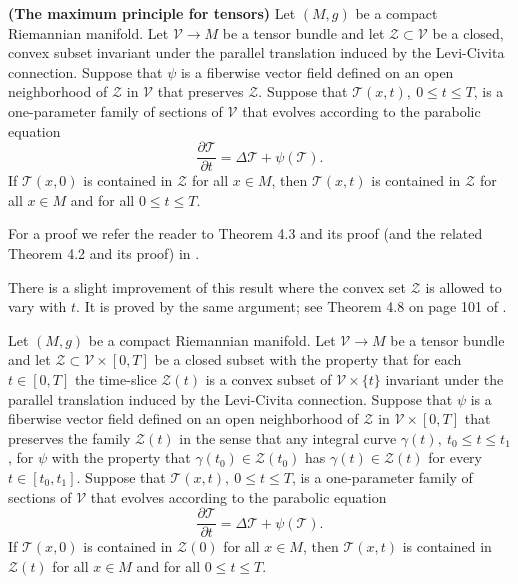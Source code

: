 \begin{theorem}
\label{thm:maximum-principle-tensors-global}
\label{MP}{\bf (The maximum principle for tensors)}
Let $(M,g)$ be a compact Riemannian manifold. Let ${\mathcal V}\to M$ be a
tensor bundle and let ${\mathcal Z}\subset {\mathcal V}$ be a closed, convex
subset invariant under the parallel translation induced by the Levi-Civita
connection. Suppose that $\psi$ is a fiberwise vector field defined on an open
neighborhood of ${\mathcal Z}$ in ${\mathcal V}$ that preserves ${\mathcal Z}$.
Suppose that ${\mathcal T}(x,t),\ 0\le t\le T$, is a one-parameter family of
sections of ${\mathcal V}$ that evolves according to the parabolic equation
$$\frac{\partial {\mathcal T}}{\partial t}=\Delta {\mathcal T}
+\psi({\mathcal T}).$$ If ${\mathcal T}(x,0)$ is contained in
${\mathcal Z}$ for all $x\in M$, then ${\mathcal T}(x,t)$ is
contained in ${\mathcal Z}$ for all $x\in M$ and for all $0\le t\le
T$.
\end{theorem}


For a proof we refer the reader to  Theorem 4.3 and its proof (and
the related Theorem 4.2 and its proof) in  \cite{Hamilton4MPCO}.

There is a slight improvement of this result where the convex set ${\mathcal
Z}$ is allowed to vary with $t$. It is proved by the same argument; see Theorem
4.8 on page 101 of \cite{ChowKnopf}.


\begin{theorem}
\label{thm:maximum-principle-tensors-varying-z}
\label{varyingZ}
Let $(M,g)$ be a compact Riemannian manifold. Let ${\mathcal V}\to M$ be a
tensor bundle and let ${\mathcal Z}\subset {\mathcal V}\times [0,T]$ be a
closed subset with the property that for each $t\in [0,T]$ the time-slice
${\mathcal Z}(t)$ is a  convex subset of ${\mathcal V}\times\{t\}$ invariant
under the parallel translation induced by the Levi-Civita connection. Suppose
that $\psi$ is a fiberwise vector field defined on an open neighborhood of
${\mathcal Z}$ in ${\mathcal V}\times [0,T]$ that preserves the family
${\mathcal Z}(t)$ in the sense that any integral curve $\gamma(t),\ t_0\le t\le
t_1$, for $\psi$ with the property that $\gamma(t_0)\in {\mathcal Z}(t_0)$ has
$\gamma(t)\in {\mathcal Z}(t)$ for every $t\in [t_0,t_1]$. Suppose that
${\mathcal T}(x,t),\ 0\le t\le T$, is a one-parameter family of sections of
${\mathcal V}$ that evolves according to the parabolic equation
$$\frac{\partial {\mathcal T}}{\partial t}=\Delta {\mathcal T}+\psi({\mathcal T}).$$
If ${\mathcal T}(x,0)$ is contained in
${\mathcal Z}(0)$ for all $x\in M$, then ${\mathcal T}(x,t)$ is
contained in ${\mathcal Z}(t)$ for all $x\in M$ and for all $0\le
t\le T$.
\end{theorem}





